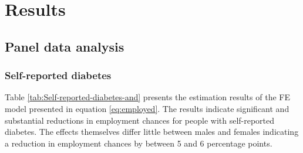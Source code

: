 \section{\label{sec:RESULTS} Results}


\subsection{Panel data analysis}

\subsubsection*{Self-reported diabetes}

Table \ref{tab:Self-reported-diabetes-and} presents the estimation
results of the \ac{FE} model presented in equation \ref{eq:employed}.
The results indicate significant and substantial reductions in employment
chances for people with self-reported diabetes. The effects themselves
differ little between males and females indicating a reduction in
employment chances by between 5 and 6 percentage points. 
